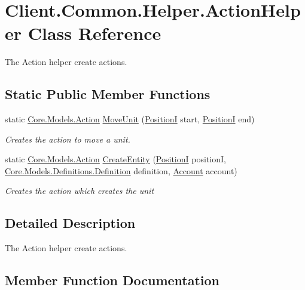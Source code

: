 \hypertarget{classClient_1_1Common_1_1Helper_1_1ActionHelper}{}\section{Client.\+Common.\+Helper.\+Action\+Helper Class Reference}
\label{classClient_1_1Common_1_1Helper_1_1ActionHelper}


The Action helper create actions.  


\subsection*{Static Public Member Functions}
\begin{DoxyCompactItemize}
\item 
static \hyperlink{classCore_1_1Models_1_1Action}{Core.\+Models.\+Action} \hyperlink{classClient_1_1Common_1_1Helper_1_1ActionHelper_a57696e59e0d3a58e65b720e79aeffb26}{Move\+Unit} (\hyperlink{classCore_1_1Models_1_1PositionI}{Position\+I} start, \hyperlink{classCore_1_1Models_1_1PositionI}{Position\+I} end)
\begin{DoxyCompactList}\small\item\em Creates the action to move a unit. \end{DoxyCompactList}\item 
static \hyperlink{classCore_1_1Models_1_1Action}{Core.\+Models.\+Action} \hyperlink{classClient_1_1Common_1_1Helper_1_1ActionHelper_a0e7689f40d850a8670d803028e249711}{Create\+Entity} (\hyperlink{classCore_1_1Models_1_1PositionI}{Position\+I} position\+I, \hyperlink{classCore_1_1Models_1_1Definitions_1_1Definition}{Core.\+Models.\+Definitions.\+Definition} definition, \hyperlink{classCore_1_1Models_1_1Account}{Account} account)
\begin{DoxyCompactList}\small\item\em Creates the action which creates the unit \end{DoxyCompactList}\end{DoxyCompactItemize}


\subsection{Detailed Description}
The Action helper create actions. 



\subsection{Member Function Documentation}
\hypertarget{classClient_1_1Common_1_1Helper_1_1ActionHelper_a0e7689f40d850a8670d803028e249711}{}
